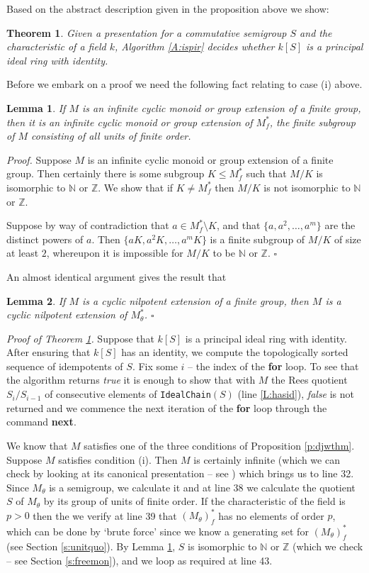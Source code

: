 \documentclass{acmconf}
\newtheorem{theorem}{Theorem}
\newtheorem{lemma}{Lemma}
\begin{document}
Based on the abstract description given in 
the proposition above we show:
\begin{theorem}\label{t:main}
Given a presentation for a commutative semigroup
$S$  and the characteristic of a field $k$, 
Algorithm \ref{A:ispir} decides whether $k[S]$ is a principal
ideal ring with identity.
\end{theorem}

Before we embark on a proof we need the following 
fact relating to case (i) above.
\begin{lemma}\label{l:fext}
If $M$ is an infinite cyclic monoid or group extension of
a finite group, then it is an infinite cyclic monoid or group extension of
$M^*_f$, the finite subgroup of $M$ consisting of all units of finite 
order.
\end{lemma}
\emph{Proof.}
Suppose $M$ is an infinite cyclic monoid or group extension of
a finite group. Then certainly there is some subgroup
$K \leq M^*_f$ such that $M/K$ is isomorphic to $\mathbb{N}$ or 
$\mathbb{Z}$. We show that if $K \neq  M^*_f$ then
$M/K$ is not isomorphic to $\mathbb{N}$ or 
$\mathbb{Z}$.

Suppose by way of contradiction 
that $a \in M^*_f \setminus K$, and that $\{a, a^2, \ldots, a^m\}$ are
the distinct powers of $a$.  Then
$\{aK, a^2K, \ldots, a^mK\}$  is a  finite subgroup of $M/K$ of
size at least $2$, whereupon it is impossible for $M/K$ to be
$\mathbb{N}$ or $\mathbb{Z}$. $\square$

An almost identical argument gives the result that
\begin{lemma}\label{l:cycnilp}
If $M$ is a cyclic nilpotent extension of a finite group, then
$M$ is a cyclic nilpotent extension of $M^*_\theta$. $\square$
\end{lemma} 


\emph{Proof of Theorem \ref{t:main}.}
Suppose that $k[S]$ is a principal ideal ring with identity.
After ensuring that $k[S]$ has an identity, we 
compute the topologically sorted sequence of idempotents of $S$.
Fix some $i$ -- the index of the {\bf for} loop. To see that the 
algorithm returns \emph{true} it is enough to show that
with $M$ the Rees quotient $S_i/S_{i-1}$ of consecutive elements of 
{\tt IdealChain}$(S)$ (line \ref{L:hasid}), \emph{false} is not
returned and we commence the next iteration of the {\bf for} loop through
the command {\bf next}. 

We know that $M$ satisfies one of the
three conditions of  Proposition \ref{p:djwthm}. Suppose 
$M$ satisfies condition (i). Then $M$ is certainly infinite
(which we can check by looking at its canonical presentation --
see \cite{bRG99}) which brings us to line 32.
Since $M_\theta$ is a semigroup, we calculate it and at line 38 
we calculate the quotient $S$ of $M_\theta$ by its group of units of 
finite order.  If the characteristic of the field is $p > 0$ then
the we verify at line 39 that $(M_\theta)^*_f$ has no elements of order $p$, 
which can be done by `brute force' since we know a generating set
for  $(M_\theta)^*_f$ (see Section \ref{s:unitquo}).
By Lemma \ref{l:fext}, $S$ is isomorphic to 
$\mathbb{N}$ or $\mathbb{Z}$ (which we check -- see 
Section \ref{s:freemon}), and we loop as required at line 43.
\end{document}
